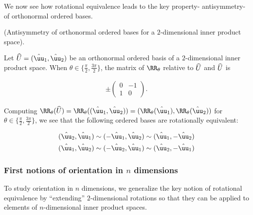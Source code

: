 We now see how rotational equivalence leads to the key property- antisymmetry- of orthonormal ordered bases.

\begin{theorem}
    \label{ch::lin_alg::thm::antisymmetry_ordered_bases_2_dimensions}

    (Antisymmetry of orthonormal ordered bases for a $2$-dimensional inner product space).
    
    Let $\hU = (\huu_1, \huu_2)$ be an orthonormal ordered basis of a $2$-dimensional inner product space. When $\theta \in \{\frac{\pi}{2}, \frac{3\pi}{2} \}$, the matrix of $\RR_\theta$ relative to $\widehat{U}$ and $\widehat{U}$ is
    
    \begin{align*}
        \pm
        \begin{pmatrix}
            0 & -1 \\
            1 & 0
        \end{pmatrix}.
    \end{align*}
    
    Computing $\RR_\theta(\hU) = \RR_\theta((\huu_1, \huu_2)) = (\RR_\theta(\huu_1), \RR_\theta(\huu_2))$ for $\theta \in \{\frac{\pi}{2}, \frac{3\pi}{2}\}$, we see that the following ordered bases are rotationally equivalent:
    
    \begin{align*}
        (\huu_2, \huu_1 ) &\sim (-\huu_1, \huu_2) \sim (\huu_1, - \huu_2) \\
        (\huu_1, \huu_2) &\sim (-\huu_2, \huu_1) \sim (\huu_2, -\huu_1)
    \end{align*}
\end{theorem}

\subsubsection*{First notions of orientation in $n$ dimensions}

To study orientation in $n$ dimensions, we generalize the key notion of rotational equivalence by ``extending'' $2$-dimensional rotations so that they can be applied to elements of $n$-dimensional inner product spaces. 

